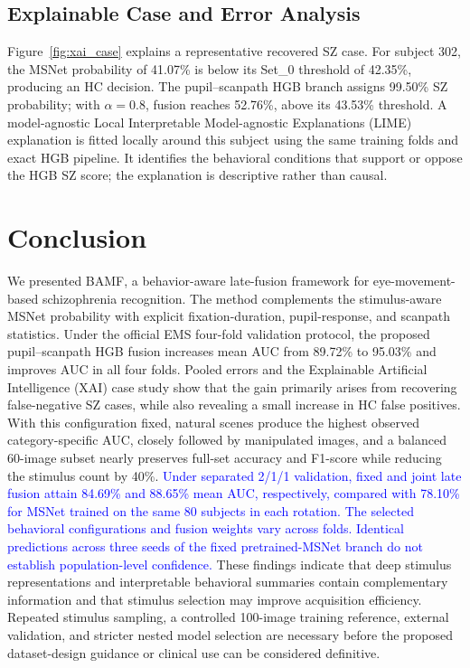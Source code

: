 \documentclass[conference,a4paper]{IEEEtran}
\begin{document}
\subsection{Explainable Case and Error Analysis}
Figure~\ref{fig:xai_case} explains a representative recovered SZ case. For subject 302, the MSNet probability of 41.07\% is below its Set\_0 threshold of 42.35\%, producing an HC decision. The pupil--scanpath HGB branch assigns 99.50\% SZ probability; with $\alpha=0.8$, fusion reaches 52.76\%, above its 43.53\% threshold. A model-agnostic Local Interpretable Model-agnostic Explanations (LIME) explanation is fitted locally around this subject using the same training folds and exact HGB pipeline. It identifies the behavioral conditions that support or oppose the HGB SZ score; the explanation is descriptive rather than causal.

\section{Conclusion}
We presented BAMF, a behavior-aware late-fusion framework for eye-movement-based schizophrenia recognition. The method complements the stimulus-aware MSNet probability with explicit fixation-duration, pupil-response, and scanpath statistics. Under the official EMS four-fold validation protocol, the proposed pupil--scanpath HGB fusion increases mean AUC from 89.72\% to 95.03\% and improves AUC in all four folds. Pooled errors and the Explainable Artificial Intelligence (XAI) case study show that the gain primarily arises from recovering false-negative SZ cases, while also revealing a small increase in HC false positives. With this configuration fixed, natural scenes produce the highest observed category-specific AUC, closely followed by manipulated images, and a balanced 60-image subset nearly preserves full-set accuracy and F1-score while reducing the stimulus count by 40\%. \textcolor{blue}{Under separated 2/1/1 validation, fixed and joint late fusion attain 84.69\% and 88.65\% mean AUC, respectively, compared with 78.10\% for MSNet trained on the same 80 subjects in each rotation. The selected behavioral configurations and fusion weights vary across folds. Identical predictions across three seeds of the fixed pretrained-MSNet branch do not establish population-level confidence.} These findings indicate that deep stimulus representations and interpretable behavioral summaries contain complementary information and that stimulus selection may improve acquisition efficiency. Repeated stimulus sampling, a controlled 100-image training reference, external validation, and stricter nested model selection are necessary before the proposed dataset-design guidance or clinical use can be considered definitive.



\end{document}
